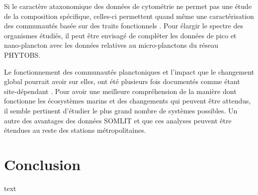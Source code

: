 \documentclass[12pt]{article}
\begin{document}
Si le caractère ataxonomique des données de cytométrie ne permet pas une étude de la composition spécifique, celles-ci permettent quand même une caractérisation des communautés basée sur des traits fonctionnels \citep{Litchman2008, LeQuere2005}. Pour élargir le spectre des organismes étudiés, il peut être envisagé de compléter les données de pico et nano-plancton avec les données relatives au micro-planctons du réseau PHYTOBS. 

Le fonctionnement des communautés planctoniques et l’impact que le changement global pourrait avoir sur elles, ont été plusieurs fois documentés comme étant site-dépendant \citep{Sommer2012, Domis2013}. Pour avoir une meilleure compréhension de la manière dont fonctionne les écosystèmes marins et des changements qui peuvent être attendus, il semble pertinent d’étudier le plus grand nombre de systèmes possibles. Un autre des avantages des données SOMLIT et que ces analyses peuvent être étendues au reste des stations métropolitaines.

\section{Conclusion}

text


\begin{singlespace}

\end{singlespace}
\end{document}
